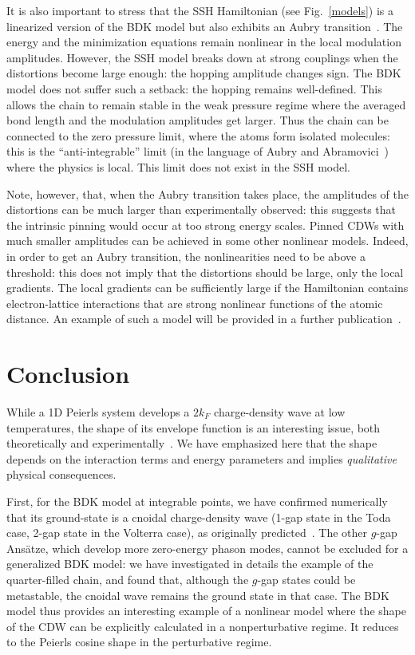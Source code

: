 \documentclass[]{revtex4-1}
\begin{document}
It is also important to stress that the SSH Hamiltonian (see Fig.~\ref{models}) is a linearized version of the BDK model but also exhibits an Aubry transition~\cite{aubry_ledaeron}. The energy and the minimization equations remain nonlinear in the local modulation amplitudes. However, the SSH model breaks down at strong couplings when the distortions become large enough: the hopping amplitude changes sign. 
The BDK model does not suffer such a setback: the hopping remains well-defined. This allows the chain to remain stable in the weak pressure regime where the averaged bond length and the modulation amplitudes get larger.
Thus the chain can be connected to the zero pressure limit, where the atoms form isolated molecules: this is the ``anti-integrable'' limit  (in the language of Aubry and Abramovici~\cite{aubry_abramovici}) where the physics is local. This limit does not exist in the SSH model.

Note, however, that, when the Aubry transition takes place, the
amplitudes of the distortions can be much larger than
experimentally observed: this suggests that the intrinsic pinning
would occur at too strong energy scales.
Pinned CDWs with much smaller amplitudes can
be achieved in some other nonlinear models. Indeed, in order to get an Aubry transition, the
nonlinearities need to be above a threshold: this does not imply that
the distortions should be large, only the local
gradients. The local gradients can be sufficiently large if the
Hamiltonian contains electron-lattice interactions that are 
strong nonlinear functions of the atomic
distance. An example of such a model will be provided in a further publication~\cite{unpublished}.

\newpage
\section{Conclusion}

While a 1D Peierls system develops a $2k_F$ charge-density wave at low temperatures, the shape of its envelope function is an interesting issue, both theoretically and experimentally~\cite{Xrays}.
We have emphasized here that the shape depends on the interaction terms and energy parameters and implies \textit{qualitative} physical consequences.

First, for the BDK model at integrable points, we have confirmed numerically that its ground-state is a cnoidal charge-density wave (1-gap state in the Toda case, 2-gap state in the Volterra case), as originally predicted~\cite{BDK}. The other $g$-gap Ans\"atze, which develop more zero-energy phason modes, cannot be excluded for a generalized BDK model:
we have investigated in details the example of the quarter-filled chain, and found that, although the $g$-gap states could be metastable, the cnoidal wave remains the ground state in that case.
The BDK model thus provides an interesting example of a nonlinear model where the shape of the CDW can be explicitly calculated in a nonperturbative regime. It reduces to the Peierls cosine shape in the perturbative regime.
\end{document}
